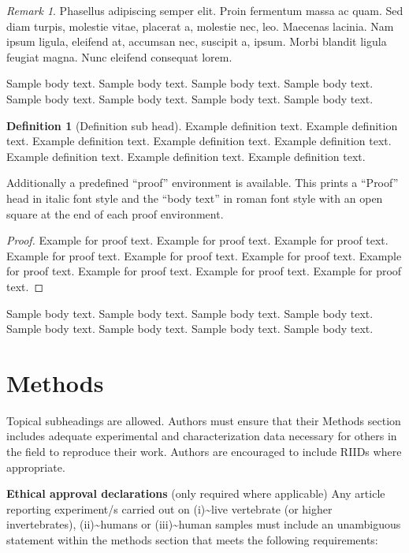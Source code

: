 \documentclass[sn-basic,pdflatex]{sn-jnl}
\theoremstyle{remark}
\newtheorem{remark}{Remark}%
\theoremstyle{definition}
\newtheorem{definition}{Definition}%
\begin{document}
\begin{remark}
Phasellus adipiscing semper elit. Proin fermentum massa ac quam. Sed
diam turpis, molestie vitae, placerat a, molestie nec, leo. Maecenas
lacinia. Nam ipsum ligula, eleifend at, accumsan nec, suscipit a, ipsum.
Morbi blandit ligula feugiat magna. Nunc eleifend consequat lorem.

\end{remark}

Sample body text. Sample body text. Sample body text. Sample body text.
Sample body text. Sample body text. Sample body text. Sample body text.

\begin{definition}[Definition sub head]
Example definition text. Example definition text. Example definition
text. Example definition text. Example definition text. Example
definition text. Example definition text. Example definition text.

\end{definition}

Additionally a predefined ``proof'' environment is available. This
prints a ``Proof'' head in italic font style and the ``body text'' in
roman font style with an open square at the end of each proof
environment.

\begin{proof}
Example for proof text. Example for proof text. Example for proof text.
Example for proof text. Example for proof text. Example for proof text.
Example for proof text. Example for proof text. Example for proof text.
Example for proof text.

\end{proof}

Sample body text. Sample body text. Sample body text. Sample body text.
Sample body text. Sample body text. Sample body text. Sample body text.

\hypertarget{sec11}{%
\section{Methods}\label{sec11}}

Topical subheadings are allowed. Authors must ensure that their Methods
section includes adequate experimental and characterization data
necessary for others in the field to reproduce their work. Authors are
encouraged to include RIIDs where appropriate.

\textbf{Ethical approval declarations} (only required where applicable)
Any article reporting experiment/s carried out on
(i)\textasciitilde live vertebrate (or higher invertebrates),
(ii)\textasciitilde humans or (iii)\textasciitilde human samples must
include an unambiguous statement within the methods section that meets
the following requirements:
\end{document}
